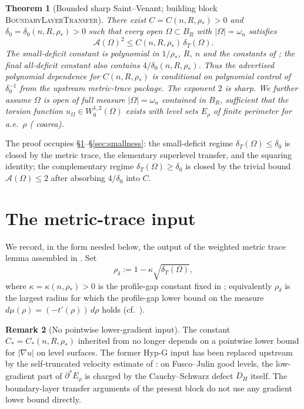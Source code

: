 \documentclass[11pt]{article}
\newtheorem{theorem}{Theorem}[section]
\theoremstyle{definition}
\newtheorem{remark}[theorem]{Remark}
\newcommand{\Fr}{\mathcal{A}}
\newcommand{\Om}{\Omega}
\newcommand{\rstar}{\rho_{*}}
\begin{document}
\begin{theorem}[Bounded sharp Saint--Venant; building block
\textsc{BoundaryLayerTransfer}]\label{thm:main}
There exist
$C=C(n,R,\rstar)>0$ and $\delta_0=\delta_0(n,R,\rstar)>0$ such that
every open $\Om\subset B_R$ with $|\Om|=\omega_n$ satisfies
\begin{equation}\label{eq:main}
\Fr(\Om)^{2}\le C(n,R,\rstar)\,\delta_T(\Om).
\end{equation}
The small-deficit constant is polynomial in $1/\rstar$, $R$, $n$
and the constants of \cite{WeightedMetricTrace}; the final all-deficit
constant also contains $4/\delta_0(n,R,\rstar)$. Thus the advertised
polynomial dependence for $C(n,R,\rstar)$ is conditional on polynomial
control of $\delta_0^{-1}$ from the upstream metric-trace package.
The exponent $2$ is sharp.
We further assume $\Om$ is open of full measure $|\Om|=\omega_n$
contained in $B_R$, sufficient that the torsion function
$u_\Om\in W^{1,2}_0(\Om)$ exists with level sets $E_\rho$ of finite
perimeter for a.e.\ $\rho$ (\cite{Maggi2012} coarea).
\end{theorem}

The proof occupies \S\ref{sec:setup}--\S\ref{sec:smallness}: the
small-deficit regime $\delta_T(\Om)\le \delta_0$ is closed by the
metric trace, the elementary superlevel transfer, and the
squaring identity; the complementary regime $\delta_T(\Om)\ge\delta_0$
is closed by the trivial bound $\Fr(\Om)\le 2$ after absorbing
$4/\delta_0$ into $C$.

\section{The metric-trace input}\label{sec:setup}

We record, in the form needed below, the output of the weighted
metric trace lemma assembled in \cite{WeightedMetricTrace}. Set
\begin{equation}\label{eq:rho-delta}
\rho_\delta:=1-\kappa\sqrt{\delta_T(\Om)},
\end{equation}
where $\kappa=\kappa(n,\rstar)>0$ is the profile-gap constant fixed
in \cite{LevelSetIdentity}; equivalently
$\rho_\delta$ is the largest radius for which the profile-gap lower
bound on the measure $d\mu(\rho)=(-t'(\rho))\,d\rho$ holds (cf.\
\cite[(5.1)]{LevelSetIdentity}).

\begin{remark}[No pointwise lower-gradient input]\label{rem:hypG}
The constant $C_*=C_*(n,R,\rstar)$ inherited from
\cite[Thm.~1.3]{WeightedMetricTrace} no longer depends on a pointwise
lower bound for $|\nabla u|$ on level surfaces.  The former Hyp-G input
has been replaced upstream by the self-truncated velocity estimate of
\cite{TrimmedVelocityRepair}: on Fusco--Julin good levels, the
low-gradient part of $\partial^*E_\rho$ is charged by the
Cauchy--Schwarz defect $D_H$ itself.  The boundary-layer transfer
arguments of the present block do not use any gradient lower bound
directly.
\end{remark}
\end{document}
